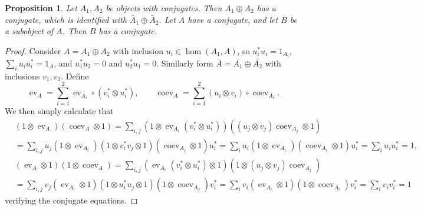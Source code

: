 \documentclass[a4paper,11pt]{article}
\theoremstyle{plain}
\newtheorem{proposition}{Proposition}[section]
\theoremstyle{remark}
\newcommand{\ev}{\operatorname{ev}}
\newcommand{\coev}{\operatorname{coev}}
\newcommand{\conj}[1]{\bar{#1}}
\begin{document}
\begin{proposition}\label{prop:directsum_subobj_conj}
Let $A_1, A_2$ be objects with conjugates.  Then $A_1\oplus A_2$ has a conjugate, which is identified with $\conj{A}_1 \oplus \conj{A}_2$.  Let $A$ have a conjugate, and let $B$ be a subobject of $A$.  Then $B$ has a conjugate.
\end{proposition}
\begin{proof}
Consider $A =A_1\oplus A_2$ with inclusion $u_i \in \hom(A_1,A)$, so $u_i^*u_i = 1_{A_i}$, $\sum_i u_i u_i^* = 1_A$, and $u_1^* u_2 = 0$ and $u_2^* u_1=0$.  Similarly form $\conj{A} = \conj{A_1} \oplus \conj{A_2}$ with inclusions $v_1, v_2$.  Define
\[ \ev_A = \sum_{i=1}^2 \ev_{A_i} \circ (v_i^* \otimes u_i^*), \qquad \coev_A = \sum_{i=1}^2 (u_i\otimes v_i) \circ \coev_{A_i}. \]
We then simply calculate that
\begin{align*}
& (1\otimes\ev_A)(\coev_A\otimes 1)
= \sum_{i,j} (1\otimes \ev_{A_i}(v_i^*\otimes u_i^*)) ((u_j\otimes v_j)\coev_{A_j}\otimes 1) \\
&= \sum_{i,j} u_j (1\otimes\ev_{A_i})(1 \otimes v_i^* v_j \otimes 1)(\coev_{A_j}\otimes 1) u_i^*
= \sum_{i} u_i (1\otimes\ev_{A_i}) (\coev_{A_i}\otimes 1) u_i^* = \sum_i u_i u_i^* = 1,
\\
& (\ev_A\otimes 1)(1\otimes\coev_A)
= \sum_{i,j} (\ev_{A_i}(v_i^*\otimes u_i^*) \otimes 1) (1 \otimes (u_j\otimes v_j)\coev_{A_j})  \\
&= \sum_{i,j} v_j (\ev_{A_i}\otimes 1) (1\otimes u_i^*u_j \otimes 1) (1 \otimes \coev_{A_j}) v_i^* 
= \sum_{i} v_i (\ev_{A_i}\otimes 1) (1 \otimes \coev_{A_i}) v_i^*
= \sum_i v_i v_i^* = 1
\end{align*}
verifying the conjugate equations.


\end{proof}
\end{document}
